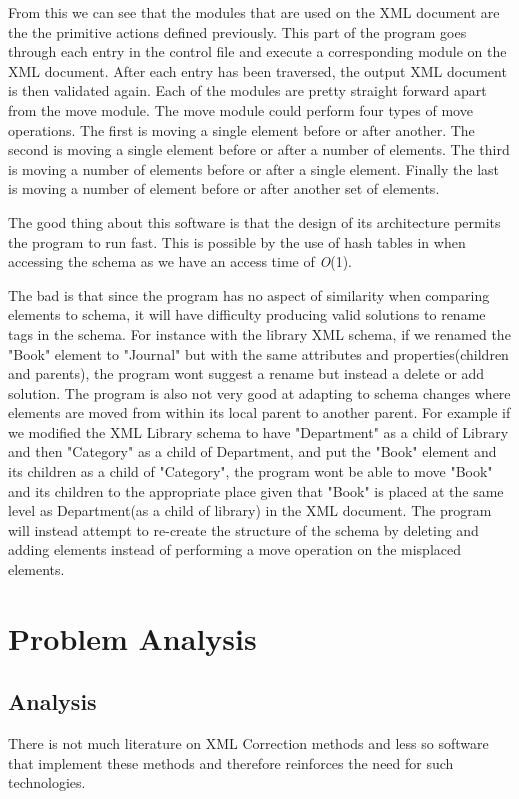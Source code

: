 \documentclass{report}
\begin{document}
From this we can see that the modules that are used on the XML document are the the primitive actions defined previously. This part of the program goes through each entry in the control file and execute a corresponding module on the XML document. After each entry has been traversed, the output XML document is then validated again. Each of the modules are pretty straight forward apart from the move module. 
The move module could perform four types of move operations. The first is moving a single element before or after another. The second is moving a single element before or after a number of elements. The third is moving a number of elements before or after a single element. Finally the last is moving a number of element before or after another set of elements.

The good thing about this software is that the design of its architecture permits the program to run fast.  This is possible by the use of hash tables in when accessing the schema as we have an access time of \textit{O}(1). 

The bad is that since the program has no aspect of similarity when comparing elements to schema, it will have difficulty producing valid solutions to rename tags in the schema. For instance with the library XML schema, if we renamed the "Book" element to "Journal" but with the same attributes and properties(children and parents), the program wont suggest a rename but instead a delete or add solution. The program is also not very good at adapting to schema changes where elements are moved from within its local parent to another parent. For example if we modified the XML Library schema to have "Department" as a child of Library and then "Category" as a child of Department, and put the "Book" element and its children as a child of "Category", the program wont be able to move "Book" and its children to the appropriate place given that "Book" is placed at the same level as Department(as a child of library) in the XML document. The program will instead attempt to re-create the structure of the schema by deleting and adding elements instead of performing a move operation on the misplaced elements. 

\chapter {Problem Analysis}
\section{Analysis}
There is not much literature on XML Correction methods and less so software that implement these methods and therefore reinforces the need for such technologies. 
\end{document}
